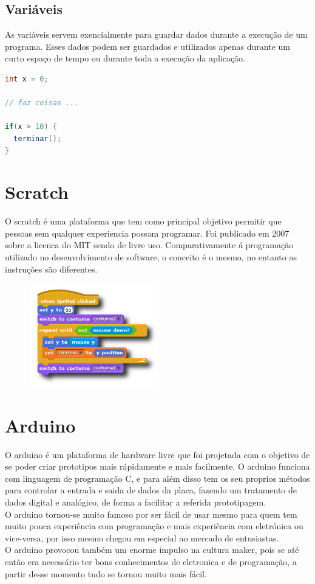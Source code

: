 \documentclass{article}
\begin{document}
\subsection{Variáveis}
As variáveis servem exencialmente para guardar dados durante a execução de um programa. Esses dados podem ser guardados e utilizados apenas durante um curto espaço de tempo ou durante toda a execução da aplicação.
\begin{lstlisting}[language=Java]
int x = 0;

// faz coisas ...

if(x > 10) {
  terminar();
}
\end{lstlisting}

\section{Scratch}
O scratch é uma plataforma que tem como principal objetivo permitir que pessoas sem qualquer experiencia possam programar. Foi publicado em 2007 sobre a licenca do MIT sendo de livre uso.\newline
Comparativamente á programação utilizado no desenvolvimento de software, o conceito é o mesmo, no entanto as instruções são diferentes.

\begin{figure}[h]
\centering
\includegraphics[width=0.5\textwidth]{img/scratch}
\end{figure}

\section{Arduino}
O arduino é um plataforma de hardware livre que foi projetada com o objetivo de se poder criar prototipos mais rápidamente e mais facilmente. O arduino funciona com linguagem de programação C, e para além disso tem os seu proprios métodos para controlar a entrada e saida de dados da placa, fazendo um tratamento de dados digital e analógico, de forma a facilitar a referida prototipagem.\newline \\
O arduino tornou-se muito famoso por ser fácil de usar mesmo para quem tem muito pouca experiência com programação e mais experiência com eletrónica ou vice-versa, por isso mesmo chegou em especial ao mercado de entusiastas.\newline \\
O arduino provocou também um enorme impulso na cultura maker, pois se até então era necessário ter bons conhecimentos de eletronica e de programação, a partir desse momento tudo se tornou muito mais fácil.\newline \\
\end{document}
